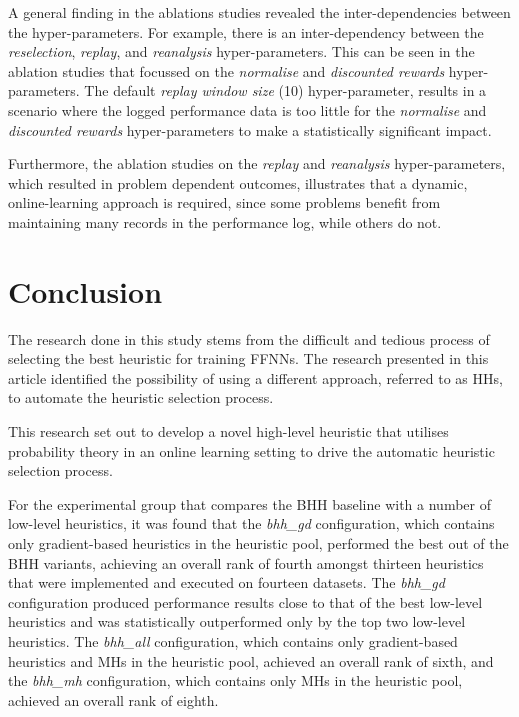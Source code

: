 \documentclass[preprint,review,12pt]{elsarticle}
\begin{document}
A general finding in the ablations studies revealed the inter-dependencies between the hyper-parameters. For example, there is an inter-dependency between the \textit{reselection}, \textit{replay}, and \textit{reanalysis} hyper-parameters. This can be seen in the ablation studies that focussed on the \textit{normalise} and \textit{discounted rewards} hyper-parameters. The default \textit{replay window size} (10) hyper-parameter, results in a scenario where the logged performance data is too little for the \textit{normalise} and \textit{discounted rewards} hyper-parameters to make a statistically significant impact.

Furthermore, the ablation studies on the \textit{replay} and \textit{reanalysis} hyper-parameters, which resulted in problem dependent outcomes, illustrates that a dynamic, online-learning approach is required, since some problems benefit from maintaining many records in the performance log, while others do not.

\section{Conclusion}
\label{sec:conclusion}

The research done in this study stems from the difficult and tedious process of selecting the best heuristic for training \acp{FFNN}. The research presented in this article identified the possibility of using a different approach, referred to as \acp{HH}, to automate the heuristic selection process.

This research set out to develop a novel high-level heuristic that utilises probability theory in an online learning setting to drive the automatic heuristic selection process.

For the experimental group that compares the \acs{BHH} baseline with a number of low-level heuristics, it was found that the \textit{bhh\_gd} configuration, which contains only gradient-based heuristics in the heuristic pool, performed the best out of the \acs{BHH} variants, achieving an overall rank of fourth amongst thirteen heuristics that were implemented and executed on fourteen datasets. The \textit{bhh\_gd} configuration produced performance results close to that of the best low-level heuristics and was statistically outperformed only by the top two low-level heuristics. The \textit{bhh\_all} configuration, which contains only gradient-based heuristics and \acp{MH} in the heuristic pool, achieved an overall rank of sixth, and the \textit{bhh\_mh} configuration, which contains only \acp{MH} in the heuristic pool, achieved an overall rank of eighth.
\end{document}
